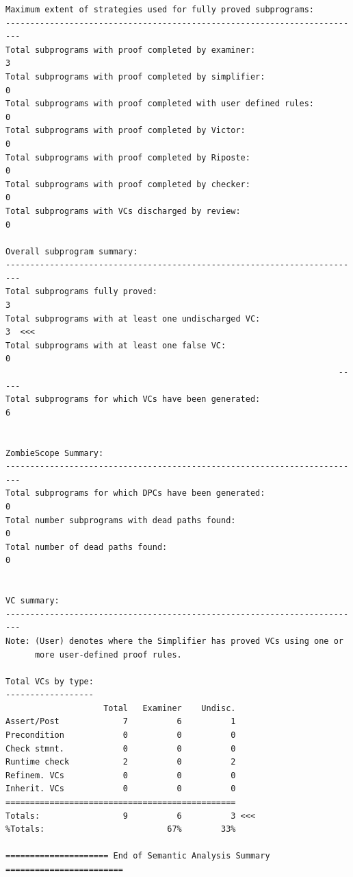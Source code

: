 \documentclass[a4paper, titlepage]{article}
\begin{document}
{\begin{lstlisting}
Maximum extent of strategies used for fully proved subprograms:
-------------------------------------------------------------------------
Total subprograms with proof completed by examiner:                     3
Total subprograms with proof completed by simplifier:                   0
Total subprograms with proof completed with user defined rules:         0
Total subprograms with proof completed by Victor:                       0
Total subprograms with proof completed by Riposte:                      0
Total subprograms with proof completed by checker:                      0
Total subprograms with VCs discharged by review:                        0

Overall subprogram summary:
-------------------------------------------------------------------------
Total subprograms fully proved:                                         3
Total subprograms with at least one undischarged VC:                    3  <<<
Total subprograms with at least one false VC:                           0
                                                                    -----
Total subprograms for which VCs have been generated:                    6


ZombieScope Summary:
-------------------------------------------------------------------------
Total subprograms for which DPCs have been generated:                   0
Total number subprograms with dead paths found:                         0
Total number of dead paths found:                                       0


VC summary:
-------------------------------------------------------------------------
Note: (User) denotes where the Simplifier has proved VCs using one or
      more user-defined proof rules.

Total VCs by type:
------------------
                    Total   Examiner    Undisc.
Assert/Post             7          6          1
Precondition            0          0          0
Check stmnt.            0          0          0
Runtime check           2          0          2
Refinem. VCs            0          0          0
Inherit. VCs            0          0          0
===============================================
Totals:                 9          6          3 <<<
%Totals:                         67%        33%

===================== End of Semantic Analysis Summary ========================

\end{lstlisting}
}
\end{document}
